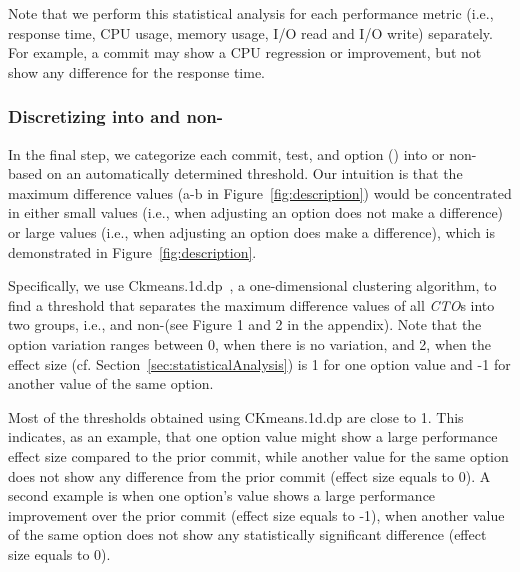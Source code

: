 Note that we perform this statistical analysis for each performance metric (i.e., response time, CPU usage, memory usage, I/O read and I/O write) separately. For example, a commit may show a CPU regression or improvement, but not show any difference for the response time. 



\subsubsection{Discretizing \instance into \inconsistent and non-\inconsistent}
\label{sec:discretizing}
In the final step, we categorize each commit, test, and option (\instance) into \inconsistent or non-\inconsistent %
based on an automatically determined threshold. Our intuition is that the maximum difference values (a-b in Figure~\ref{fig:description}) would be concentrated in either small values %
(i.e., when adjusting an option does not make a difference) or large values (i.e., when adjusting an option does make a difference), which is demonstrated in Figure~\ref{fig:description}. %

Specifically, we use Ckmeans.1d.dp~\cite{Ckmeans138:online}, a one-dimensional clustering algorithm, to find a threshold that separates the maximum difference values of all \emph{CTO}s %
into two groups, i.e., \inconsistent and non-\inconsistent (see Figure 1 and 2 in the appendix). 
Note that the option variation ranges between 0, when there is no variation, and 2, when the effect size (cf. Section~\ref{sec:statisticalAnalysis}) is 1 for one option value and -1 for another value of the same option.

Most of the thresholds obtained using CKmeans.1d.dp are close to 1. This indicates, as an example, that one option value might show a large performance effect size compared to the prior commit, while another value for the same option does not show any difference from the prior commit (effect size equals to 0). A second example is when one option's value shows a large performance improvement over the prior commit (effect size equals to -1), when another value of the same option does not show any statistically significant difference (effect size equals to 0).

